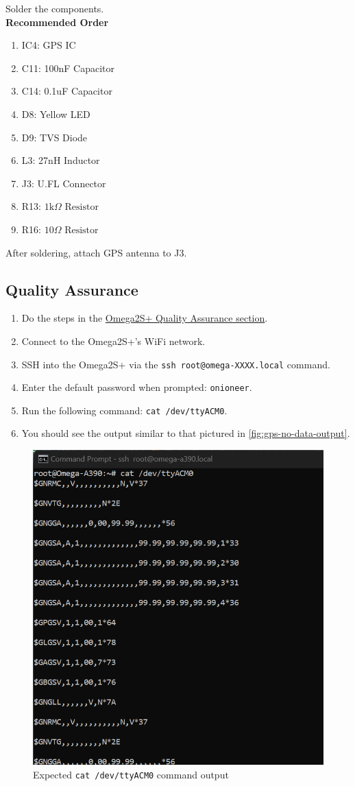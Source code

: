 \documentclass{article}
\newcommand{\resistor}[1]{$\text{#1} \Omega \text{ Resistor}$}
\begin{document}
Solder the components. \\

\noindent \textbf{Recommended Order}

\begin{enumerate}
  \item IC4: GPS IC
  \item C11: 100nF Capacitor
  \item C14: 0.1uF Capacitor
  \item D8: Yellow LED
  \item D9: TVS Diode
  \item L3: 27nH Inductor
  \item J3: U.FL Connector
  \item R13: \resistor{1k}
  \item R16: \resistor{10}
\end{enumerate}

After soldering, attach GPS antenna to J3.

\subsection{Quality Assurance}

\begin{enumerate}
  \item Do the steps in the \hyperref[sec:qual-omega]{Omega2S+ Quality Assurance section}.
  \item Connect to the Omega2S+'s WiFi network.
  \item SSH into the Omega2S+ via the \texttt{ssh root@omega-XXXX.local} command.
  \item Enter the default password when prompted: \texttt{onioneer}.
  \item Run the following command: \texttt{cat /dev/ttyACM0}.
  \item You should see the output similar to that pictured in \autoref{fig:gps-no-data-output}.
\end{enumerate}

\begin{figure}[H]
    \centering
    \includegraphics[width=0.5\linewidth]{./images/gps_no_lock_cat_output.png}
    \caption{Expected \texttt{cat /dev/ttyACM0} command output}
    \label{fig:gps-no-data-output}
\end{figure}
\end{document}
